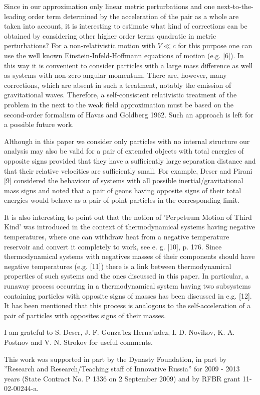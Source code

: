\documentclass[aip,nofootinbib]{revtex4}
\begin{document}
Since in our approximation only linear metric perturbations and
one next-to-the-leading order term determined by the acceleration
of the pair as a whole are taken into account, it is interesting
to estimate what kind of corrections can be obtained by
considering other higher order terms quadratic in metric
perturbations? For a non-relativistic motion with $V \ll c$ for
this purpose one can use the well known Einstein-Infeld-Hoffmann
equations of motion (e.g. [6]). In this way it is convenient to
consider particles with a large mass difference as well as systems
with non-zero angular momentum. There are, however, many
corrections, which are absent in such a treatment, notably the
emission of gravitational waves. Therefore, a self-consistent
relativistic treatment of the problem in the next to the weak
field approximation must be based on the second-order formalism of
Havas and Goldberg 1962. Such an approach is left for a possible
future work.

Although in this paper we consider only particles with no internal
structure our analysis may also be valid for a pair of extended
objects with total energies of opposite signs provided that they
have a sufficiently large separation distance and that their
relative velocities are sufficiently small. For example,  Deser
and Pirani [9] considered the behaviour of systems with all
possible inertial/gravitational mass signs and noted that a pair
of geons having opposite signs of their total energies would
behave as a pair of point particles in the corresponding limit.

It is also interesting to point out that the notion of 'Perpetuum
Motion of Third Kind' was introduced in the context of
thermodynamical systems having negative temperatures, where one
can withdraw heat from a negative temperature reservoir and
convert it completely to work, see e. g. [10], p. 176. Since
thermodynamical systems with negatives masses of their components
should have negative temperatures (e.g. [11]) there is a link
between thermodynamical properties of such systems and the ones
discussed in this paper. In particular, a runaway process
occurring in a thermodynamical system having two subsystems
containing particles with opposite signs of masses has been
discussed in e.g. [12]. It has been mentioned that this process is
analogous to the self-acceleration of a pair of particles with
opposites signs of their masses.



\begin{acknowledgments}
I am grateful to S. Deser, J. F. Gonza'lez Herna'ndez,  I. D.
Novikov, K. A. Postnov and V. N. Strokov  for useful comments.

This work was supported in part by the Dynasty Foundation, in part
by ''Research and Research/Teaching staff of Innovative Russia''
for 2009 - 2013 years (State Contract No. P 1336 on 2 September
2009) and by RFBR grant 11-02-00244-a.

\end{acknowledgments}
\end{document}
